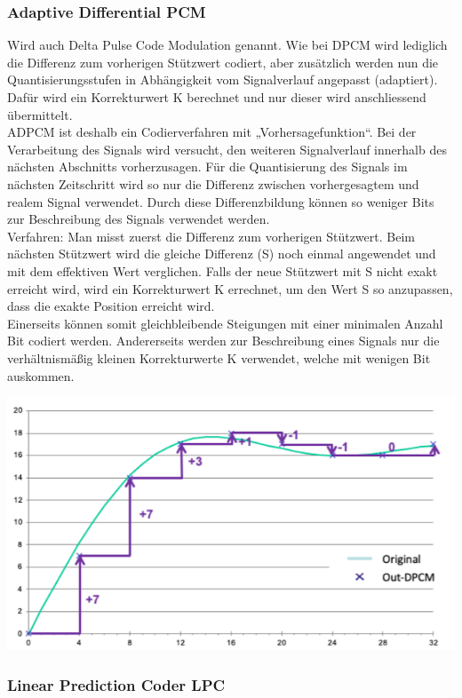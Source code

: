 \subsubsection{Adaptive Differential PCM}%
Wird auch Delta Pulse Code Modulation genannt. Wie bei DPCM wird lediglich die Differenz zum vorherigen Stützwert codiert, aber zusätzlich werden nun die Quantisierungsstufen in Abhängigkeit vom Signalverlauf angepasst (adaptiert). Dafür wird ein Korrekturwert K berechnet und nur dieser wird anschliessend übermittelt.
\\
ADPCM ist deshalb ein Codierverfahren mit „Vorhersagefunktion“. Bei der Verarbeitung
des Signals wird versucht, den weiteren Signalverlauf innerhalb des nächsten
Abschnitts vorherzusagen. Für die Quantisierung des Signals im nächsten Zeitschritt
wird so nur die Differenz zwischen vorhergesagtem und realem Signal verwendet. Durch
diese Differenzbildung können so weniger Bits zur Beschreibung des Signals verwendet
werden.
\\
Verfahren: Man misst zuerst die Differenz zum vorherigen Stützwert. Beim nächsten
Stützwert wird die gleiche Differenz (S) noch einmal angewendet und mit dem effektiven
Wert verglichen. Falls der neue Stützwert mit S nicht exakt erreicht wird, wird ein
Korrekturwert K errechnet, um den Wert S so anzupassen, dass die exakte Position
erreicht wird. 
\\
Einerseits können somit gleichbleibende Steigungen mit einer minimalen Anzahl Bit
codiert werden. Andererseits werden zur Beschreibung eines Signals nur die
verhältnismäßig kleinen Korrekturwerte K verwendet, welche mit wenigen Bit
auskommen.
\begin{center}
    \includegraphics[width=1\linewidth]{images/dpcm.png}
\end{center}

\subsubsection{Linear Prediction Coder LPC}%
\label{ssub:linear_prediction_coder_lpc}

